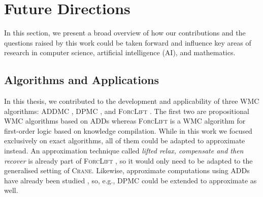 

\section{Future Directions}\label{sec:future}

In this section, we present a broad overview of how our contributions and the
questions raised by this work could be taken forward and influence key areas of
research in computer science, artificial intelligence (AI), and mathematics.

\subsection{Algorithms and Applications}


In this thesis, we contributed to the development and applicability of three WMC
algorithms: \textsc{ADDMC} \citep{DBLP:conf/aaai/DudekPV20}, \textsc{DPMC}
\citep{DBLP:conf/cp/DudekPV20}, and \textsc{ForcLift}
\citep{DBLP:conf/ijcai/BroeckTMDR11}. The first two are propositional WMC
algorithms based on ADDs whereas \textsc{ForcLift} is a WMC algorithm for
first-order logic based on knowledge compilation. While in this work we focused
exclusively on exact algorithms, all of them could be adapted to approximate
instead. An approximation technique called \emph{lifted relax, compensate and
  then recover} is already part of \textsc{ForcLift}
\citep{DBLP:conf/uai/BroeckCD12}, so it would only need to be adapted to the
generalised setting of \textsc{Crane}. Likewise, approximate computations using
ADDs have already been studied \citep{DBLP:conf/nips/St-AubinHB00}, so, e.g.,
\textsc{DPMC} could be extended to approximate as well.

